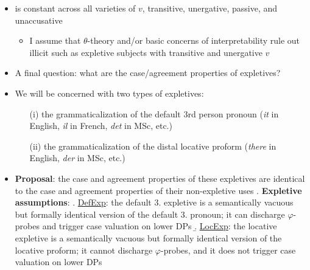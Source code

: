 \documentclass[letterpaper,10pt]{handout_nick}
\begin{document}
\begin{itemize}
\item \Last is constant across all varieties of $v$, transitive, unergative, passive, and unaccusative
\begin{itemize}
\item I assume that $\theta$-theory and/or basic concerns of interpretability rule out illicit such as expletive subjects with transitive and unergative $v$ 
\end{itemize}
\item A final question: what are the case/agreement properties of expletives? 
\item We will be concerned with two types of expletives:
\begin{itemize}
\item[(i)] the grammaticalization of the default 3rd person pronoun (\emph{it} in English, \emph{il} in French, \emph{det} in MSc, etc.)
\item[(ii)] the grammaticalization of the distal locative proform (\emph{there} in English, \emph{der} in MSc, etc.) 
\end{itemize}
\item \textbf{Proposal}: the case and agreement properties of these expletives are identical to the case and agreement properties of their non-expletive uses 
\ex. \textbf{Expletive assumptions}:
\a. \underline{DefExp}: the default 3. expletive is a semantically vacuous but formally identical version of the default 3. pronoun; it can discharge $\varphi$-probes and trigger case valuation on lower DPs
\b. \underline{LocExp}: the locative expletive is a semantically vacuous but formally identical version of the locative proform; it cannot discharge $\varphi$-probes, and it does not trigger case valuation on lower DPs



\end{itemize}
\end{document}

